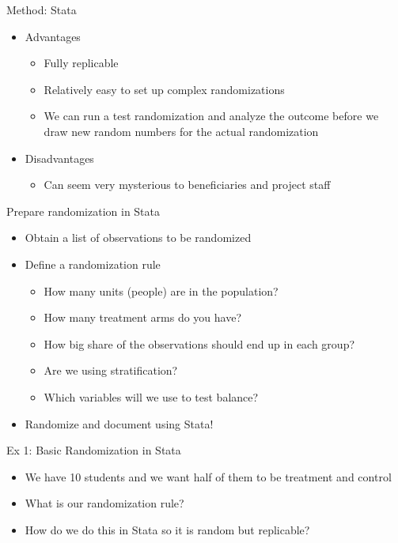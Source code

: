 \documentclass[aspectratio=169]{beamer}
\begin{document}
\begin{frame}{Method: Stata}
\begin{itemize}
	\item Advantages
		\begin{itemize}
			\item Fully replicable
			\item Relatively easy to set up complex randomizations
			\item We can run a test randomization and analyze the outcome before we draw new random numbers for the actual randomization
		\end{itemize}
	\item Disadvantages
		\begin{itemize}
			\item Can seem very mysterious to beneficiaries and project staff
		\end{itemize}
\end{itemize}
\end{frame}



\begin{frame}{Prepare randomization in Stata}
\begin{itemize}
	\item Obtain a list of observations to be randomized
	\item Define a randomization rule
		\begin{itemize}
			\item How many units (people) are in the population?
			\item How many treatment arms do you have?
			\item How big share of the observations should end up in each group?
			\item Are we using stratification?
			\item Which variables will we use to test balance?
		\end{itemize}
	\item Randomize and document using Stata!
\end{itemize}
\end{frame}



\begin{frame}{Ex 1: Basic Randomization in Stata}
\begin{itemize}
	\item We have 10 students and we want half of them to be treatment and control
	\item What is our randomization rule?
	\item How do we do this in Stata so it is random but replicable?
\end{itemize}
\end{frame}
\end{document}
